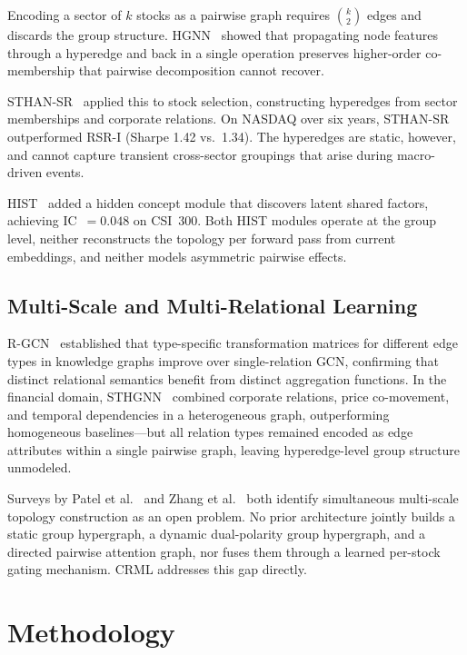 \documentclass[journal]{IEEEtran}
\begin{document}
Encoding a sector of $k$ stocks as a pairwise graph requires
$\binom{k}{2}$ edges and discards the group structure.
HGNN~\cite{feng2019hypergraph} showed that propagating node features
through a hyperedge and back in a single operation preserves
higher-order co-membership that pairwise decomposition cannot recover.

STHAN-SR~\cite{sawhney2021sthan} applied this to stock selection,
constructing hyperedges from sector memberships and corporate relations.
On NASDAQ over six years, STHAN-SR outperformed RSR-I (Sharpe 1.42
vs.\ 1.34). The hyperedges are static, however, and cannot capture
transient cross-sector groupings that arise during macro-driven events.

HIST~\cite{xu2021hist} added a hidden concept module that discovers
latent shared factors, achieving IC~$=0.048$ on CSI~300. Both HIST
modules operate at the group level, neither reconstructs the topology
per forward pass from current embeddings, and neither models asymmetric
pairwise effects.

\subsection{Multi-Scale and Multi-Relational Learning}

R-GCN~\cite{schlichtkrull2018modeling} established that type-specific
transformation matrices for different edge types in knowledge graphs
improve over single-relation GCN, confirming that distinct relational
semantics benefit from distinct aggregation functions. In the financial
domain, STHGNN~\cite{xiang2022temporal} combined corporate relations,
price co-movement, and temporal dependencies in a heterogeneous graph,
outperforming homogeneous baselines---but all relation types remained
encoded as edge attributes within a single pairwise graph, leaving
hyperedge-level group structure unmodeled.

Surveys by Patel et al.~\cite{patel2024gnn} and Zhang
et al.~\cite{zhang2024neural} both identify simultaneous multi-scale
topology construction as an open problem. No prior architecture jointly
builds a static group hypergraph, a dynamic dual-polarity group
hypergraph, and a directed pairwise attention graph, nor fuses them
through a learned per-stock gating mechanism. CRML addresses this gap
directly.

\section{Methodology}
\end{document}
